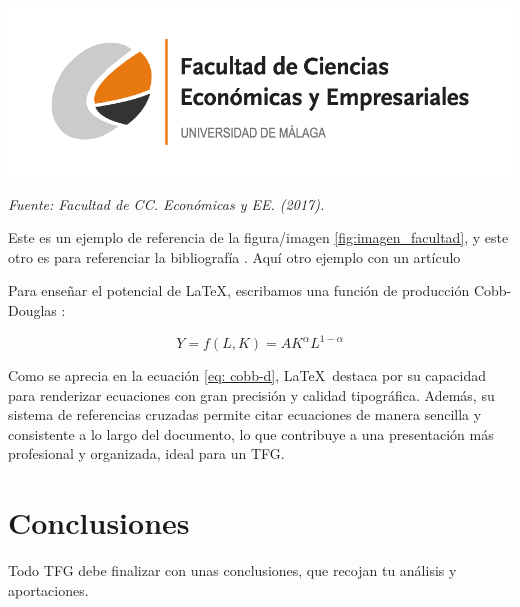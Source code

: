 \documentclass[13pt,a4paper]{report}
\begin{document}
\begin{center}
    \centering %
    \includegraphics[width=\linewidth]{logo.png} %
    \label{fig:imagen_facultad} %
    \par %
    \raggedright %
    {\fontsize{12}{14}\selectfont\textit{Fuente: Facultad de CC. Económicas y EE. (2017).}} %
\end{center}


Este es un ejemplo de referencia de la figura/imagen \ref{fig:imagen_facultad}, y este otro es para referenciar la bibliografía \citep{tfg_sample}. Aquí otro ejemplo con un artículo \citep{baccini2007edgeworth}


Para enseñar el potencial de \LaTeX, escribamos una función de producción Cobb-Douglas \citep{cobb_theory_1928}: 

\begin{equation}
    Y = f(L,K) = A K^\alpha L^{1-\alpha} \label{eq: cobb-d}
\end{equation}


Como se aprecia en la ecuación \ref{eq: cobb-d}, \LaTeX\ destaca por su capacidad para renderizar ecuaciones con gran precisión y calidad tipográfica. Además, su sistema de referencias cruzadas permite citar ecuaciones de manera sencilla y consistente a lo largo del documento, lo que contribuye a una presentación más profesional y organizada, ideal para un TFG.
\section{Conclusiones} 


Todo TFG debe finalizar con unas conclusiones, que recojan tu análisis y aportaciones.



\renewcommand{\bibname}{\fontsize{16}{20}\selectfont Bibliografía} %
\renewcommand{\bibfont}{\fontsize{13}{15}\selectfont} %
\end{document}
